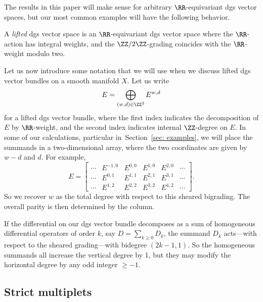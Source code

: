 \documentclass[10pt,a4paper]{amsart}
\numberwithin{equation}{section}
\begin{document}
The results in this paper will make sense for arbitrary $\RR$-equivariant dgs vector spaces, but our most common examples will have the following behavior.

\begin{dfn}
	A \emph{lifted} dgs vector space is an $\RR$-equivariant dgs vector space where the $\RR$-action has integral weights, and the $\ZZ/2\ZZ$-grading coincides with the $\RR$-weight modulo two.
\end{dfn}

Let us now introduce some notation that we will use when we discuss lifted dgs vector bundles on a smooth manifold $X$. Let us write
\begin{equation*}
E = \bigoplus_{(w,d) \in \ZZ^2} E^{w,d}
\end{equation*}
for a lifted dgs vector bundle, where the first index indicates the decomposition of $E$ by $\RR$-weight, and the second index indicates internal $\ZZ$-degree on $E$. In some of our calculations, particular in~Section~\ref{sec: examples}, we will place the summands in a two-dimensional array, where the two coordinates are given by $w-d$ and $d$. For example,
\begin{equation*}
E =
\begin{bmatrix}
\cdots &E^{-1,0} &E^{0,0} &E^{1,0} &E^{2,0}&\cdots\\
\cdots &E^{0,1} &E^{1,1} &E^{2,1} &E^{3,1}&\cdots\\
\cdots &E^{1,2} &E^{2,2} &E^{3,2} &E^{4,2} &\cdots
\end{bmatrix}.
\end{equation*}
So we recover $w$ as the total degree with respect to this sheared bigrading. The overall parity is then determined by the column.

If the differential on our dgs vector bundle decomposes as a sum of homogeneous differential operators of order $k$, say $D = \sum_{k \ge 0} D_k$, the summand $D_k$ acts---with respect to the sheared grading---with bidegree $(2k-1, 1)$. So the homogeneous summands all increase the vertical degree by 1, but they may modify the horizontal degree by any odd integer $\ge -1$.

\subsection{Strict multiplets}
\end{document}
